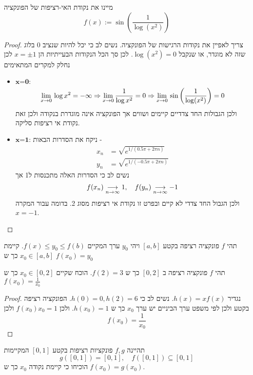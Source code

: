 \documentclass{article}
\begin{document}
\begin{exercise}
מיינו את נקודת האי-רציפות של הפונקציה 
\[f(x):=\sin\left(\frac{1}{\log(x^2)}\right)\]
\end{exercise}

\begin{proof}
צריך לאפיין את נקודות הרגישות של הפונקציה. נשים לב כי יכל להיות שנציב 0 בלוג שזה לא מוגדר, או שנקבל 
$\log(x^2) = 0$. 
לכן סך הכל הנקודות הבעייתיות הן 
$x = \pm 1$
לכן נחלק למקרים המתאימים 
\begin{itemize}
\item $\textbf{x=0:}$
\[\underset{x\rightarrow0}{\lim}\, \log x^2 = -\infty \Rightarrow \underset{x\rightarrow0}{\lim}\, \frac{1}{\log x^2} = 0 \Rightarrow \underset{x\rightarrow0}{\lim}\, \sin\left(\frac{1}{\log(x^2)}\right) = 0\]
ולכן הגבולות החד צדדיים קיימים ושווים אך הפונקציה אינה מוגדרת בנקודה ולכן זאת נקודת אי רציפות סליקה. 
\item $\textbf{x=1:}$
ניקח את הסדרות הבאות - 
\begin{align*}
x_n &= \sqrt{e^{1/\left(0.5\pi +2\pi n\right)}} \\
y_n &= \sqrt{e^{1/\left(-0.5\pi +2\pi n\right)}}
\end{align*}
נשים לב כי הסדרות האלה מתכנסות ל1 אך 
\[f(x_n)\underset{n\rightarrow\infty}{\longrightarrow} 1,\quad f(y_n)\underset{n\rightarrow\infty}{\longrightarrow} -1\]
ולכן הגבול החד צדדי לא קיים ובפרט זו נקודת אי רציפות מסוג 2. בדומה עבור המקרה 
$x=-1$.
\end{itemize}
\end{proof}
\newpage
\begin{theorem}
תהי 
$f$
פונקציה רציפה בקטע 
$[a, b]$
ויהי 
$y_0$
ערך המקיים 
$f(x)\leq y_0\leq f(b)$.
קיימת 
$x_0\in[a, b]$
כך ש 
$f(x_0)=y_0$
\end{theorem}

\begin{exercise}
תהי 
$f$
פונקציה רציפה ב 
$[0,2]$
כך ש 
$f(2)=3$.
הוכח שקיים 
$x_0\in [0, 2]$
כך ש 
$f(x_0)=\frac{1}{x_0}$
\end{exercise}

\begin{proof}
נגדיר 
$h(x)=x f(x)$.
נשים לב כי 
$h(0)=0, h(2)=6$. 
הפונקציה רציפה בקטע ולכן לפי משפט ערך הביניים יש ערך 
$x_0$
כך ש 
$h(x_0)=1$. 
ולכן 
$f(x_0)x_0 = 1$
ולכן 
\[f(x_0)=\frac{1}{x_0}\]
\end{proof}

\begin{exercise}
תהיינה 
$f,g$
פונקציות רציפות בקטע 
$[0, 1]$
המקיימות 
\[g([0, 1])=[0, 1], \quad f([0, 1])\subseteq [0,1]\]
הוכיחו כי קיימת נקודה 
$x_0$
כך ש 
$f(x_0)=g(x_0)$.
\end{exercise}
\end{document}
